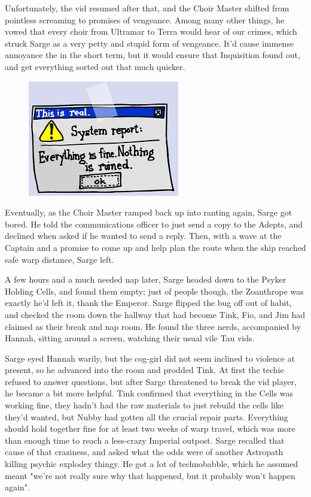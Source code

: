Unfortunately, the vid resumed after that, and the Choir Master shifted from pointless screaming to promises of vengeance. 
Among many other things, he vowed that every choir from Ultramar to Terra would hear of our crimes, which struck Sarge as a very petty and stupid form of vengeance. 
It'd cause immense annoyance the in the short term, but it would ensure that Inquisition found out, and get everything sorted out that much quicker. 


\begin{figure}
	\begin{center}
		\includegraphics[width=\figwidth]{pics/14/51.png}
	\end{center}
\end{figure}
Eventually, as the Choir Master ramped back up into ranting again, Sarge got bored. 
He told the communications officer to just send a copy to the Adepts, and declined when asked if he wanted to send a reply. 
Then, with a wave at the Captain and a promise to come up and help plan the route when the ship reached safe warp distance, Sarge left.

A few hours and a much needed nap later, Sarge headed down to the Psyker Holding Cells, and found them empty; 
just of people though, the Zoanthrope was exactly he'd left it, thank the Emperor. 
Sarge flipped the bug off out of habit, and checked the room down the hallway that had become Tink, Fio, and Jim had claimed as their break and nap room. 
He found the three nerds, accompanied by Hannah, sitting around a screen, watching their usual vile Tau vids. 


Sarge eyed Hannah warily, but the cog-girl did not seem inclined to violence at present, so he advanced into the room and prodded Tink. 
At first the techie refused to answer questions, but after Sarge threatened to break the vid player, he became a bit more helpful. 
Tink confirmed that everything in the Cells was working fine, they hadn't had the raw materials to just rebuild the cells like they'd wanted, but Nubby had gotten all the crucial repair parts. 
Everything should hold together fine for at least two weeks of warp travel, which was more than enough time to reach a less-crazy Imperial outpost. 
Sarge recalled that cause of that craziness, and asked what the odds were of another Astropath killing psychic explodey thingy. 
He got a lot of technobabble, which he assumed meant "we're not really sure why that happened, but it probably won't happen again".

